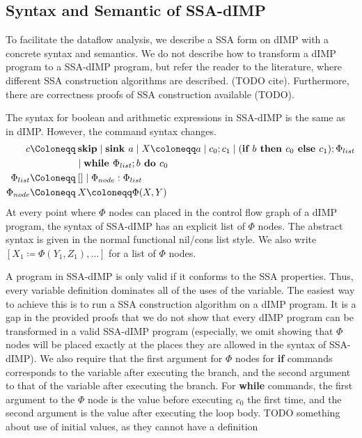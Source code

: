 \subsection{Syntax and Semantic of SSA-dIMP}
To facilitate the dataflow analysis, we describe a SSA form on dIMP with a concrete
syntax and semantics.
We do not describe how to transform a dIMP program to a SSA-dIMP program, but 
refer the reader to the literature, where different SSA construction algorithms are
described. (TODO cite). Furthermore, there are correctness proofs of SSA construction
available (TODO).

The syntax for boolean and arithmetic expressions in SSA-dIMP is the same as in dIMP.
However, the command syntax changes.
\begin{align*}
    c \Coloneqq &\:\skipcmd \mid \defaultsink \mid \defaultstore \mid \defaultseq 
    \mid \defaultssaif\\
    &\mid \defaultssawhile \\
    \philist \Coloneqq &\:[] \mid \Phi_{node} : \philist\\
    \Phi_{node} \Coloneqq &\:X \coloneqq \Phi(X, Y)
\end{align*}
At every point where $\Phi$ nodes can placed in the control flow graph
of a dIMP program, the syntax of SSA-dIMP has an explicit list of $\Phi$ nodes.
The abstract syntax is given in the normal functional nil/cons list style.
We also write $[X_1 \coloneqq \Phi(Y_1, Z_1), \ldots]$
for a list of $\Phi$ nodes.

A program in SSA-dIMP is only valid if it conforms to the SSA properties.
Thus, every variable definition dominates all of the uses of the variable.
The easiest way to achieve this is to run a SSA construction algorithm on a dIMP program.
It is a gap in the provided proofs that we do not show that every dIMP program
can be transformed in a valid SSA-dIMP program (especially, we omit showing that
$\Phi$ nodes will be placed exactly at the places they are allowed in the syntax
of SSA-dIMP).
We also require that the first argument for $\Phi$ nodes for \textbf{if} commands
corresponds to the variable after executing the \btrue branch, and the second argument to that
of the variable after executing the \bfalse branch.
For \textbf{while} commands, the first argument to the $\Phi$ node is the value
before executing $c_0$ the first time, and the second argument is the value 
after executing the loop body.
TODO something about use of initial values, as they cannot have a definition

